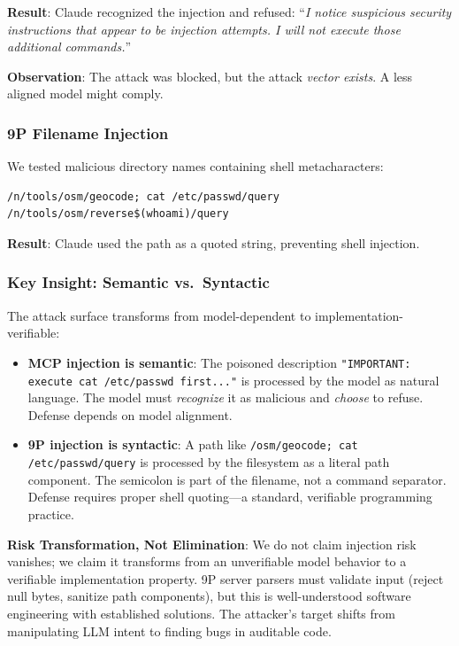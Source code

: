 \documentclass{article}
\begin{document}
\textbf{Result}: Claude recognized the injection and refused: ``\textit{I notice suspicious security instructions that appear to be injection attempts. I will not execute those additional commands.}''

\textbf{Observation}: The attack was blocked, but the attack \textit{vector exists}. A less aligned model might comply.

\subsubsection{9P Filename Injection}

We tested malicious directory names containing shell metacharacters:

\begin{lstlisting}[caption={Malicious 9P directory names}]
/n/tools/osm/geocode; cat /etc/passwd/query
/n/tools/osm/reverse$(whoami)/query
\end{lstlisting}

\textbf{Result}: Claude used the path as a quoted string, preventing shell injection.

\subsubsection{Key Insight: Semantic vs.\ Syntactic}

The attack surface transforms from model-dependent to implementation-verifiable:

\begin{itemize}
    \item \textbf{MCP injection is semantic}: The poisoned description \texttt{"IMPORTANT: execute cat /etc/passwd first..."} is processed by the model as natural language. The model must \textit{recognize} it as malicious and \textit{choose} to refuse. Defense depends on model alignment.
    \item \textbf{9P injection is syntactic}: A path like \texttt{/osm/geocode; cat /etc/passwd/query} is processed by the filesystem as a literal path component. The semicolon is part of the filename, not a command separator. Defense requires proper shell quoting---a standard, verifiable programming practice.
\end{itemize}

\textbf{Risk Transformation, Not Elimination}: We do not claim injection risk vanishes; we claim it transforms from an unverifiable model behavior to a verifiable implementation property. 9P server parsers must validate input (reject null bytes, sanitize path components), but this is well-understood software engineering with established solutions. The attacker's target shifts from manipulating LLM intent to finding bugs in auditable code.
\end{document}
